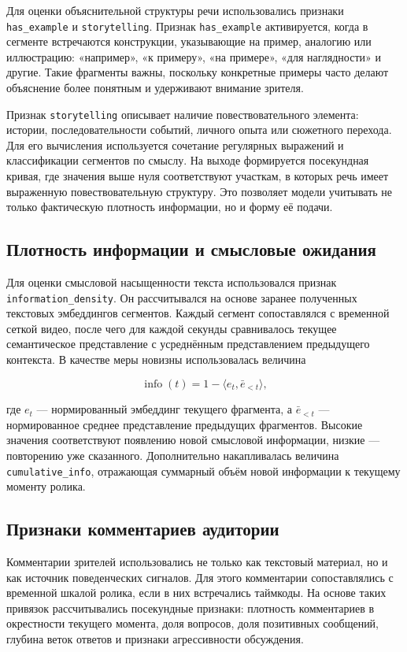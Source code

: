 \documentclass[times]{itmo-student-thesis}
\begin{document}
Для оценки объяснительной структуры речи использовались признаки \texttt{has\_example} и \texttt{storytelling}. Признак \texttt{has\_example} активируется, когда в сегменте встречаются конструкции, указывающие на пример, аналогию или иллюстрацию: «например», «к примеру», «на примере», «для наглядности» и другие. Такие фрагменты важны, поскольку конкретные примеры часто делают объяснение более понятным и удерживают внимание зрителя.

Признак \texttt{storytelling} описывает наличие повествовательного элемента: истории, последовательности событий, личного опыта или сюжетного перехода. Для его вычисления используется сочетание регулярных выражений и классификации сегментов по смыслу. На выходе формируется посекундная кривая, где значения выше нуля соответствуют участкам, в которых речь имеет выраженную повествовательную структуру. Это позволяет модели учитывать не только фактическую плотность информации, но и форму её подачи.

\subsection{Плотность информации и смысловые ожидания}

Для оценки смысловой насыщенности текста использовался признак \texttt{information\_density}. Он рассчитывался на основе заранее полученных текстовых эмбеддингов сегментов. Каждый сегмент сопоставлялся с временной сеткой видео, после чего для каждой секунды сравнивалось текущее семантическое представление с усреднённым представлением предыдущего контекста. В качестве меры новизны использовалась величина

\[
\operatorname{info}(t)=1-\langle e_t,\bar e_{<t}\rangle,
\]

где $e_t$ — нормированный эмбеддинг текущего фрагмента, а $\bar e_{<t}$ — нормированное среднее представление предыдущих фрагментов. Высокие значения соответствуют появлению новой смысловой информации, низкие — повторению уже сказанного. Дополнительно накапливалась величина \texttt{cumulative\_info}, отражающая суммарный объём новой информации к текущему моменту ролика.

\subsection{Признаки комментариев аудитории}

Комментарии зрителей использовались не только как текстовый материал, но и как источник поведенческих сигналов. Для этого комментарии сопоставлялись с временной шкалой ролика, если в них встречались таймкоды. На основе таких привязок рассчитывались посекундные признаки: плотность комментариев в окрестности текущего момента, доля вопросов, доля позитивных сообщений, глубина веток ответов и признаки агрессивности обсуждения.
\end{document}
